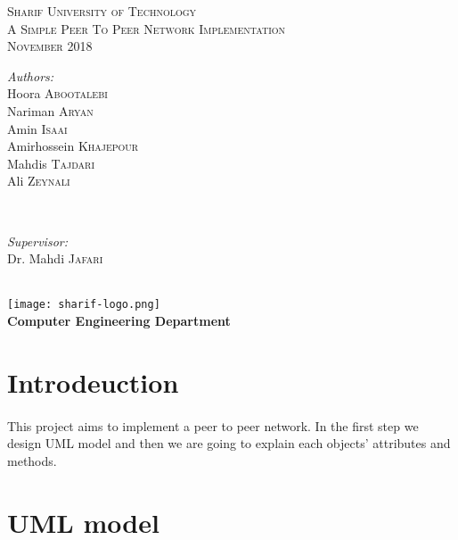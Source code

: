 \documentclass{article}
\begin{document}
\begin{titlepage}
\begin{center}
\textsc{\LARGE Sharif University of Technology}\\[1.5cm]
\textsc{\Large A Simple Peer To Peer Network Implementation}\\[0.5cm]
\textsc{\large November 2018}\\

\begin{minipage}{0.4\textwidth}
\begin{flushleft} \large
\emph{Authors:}\\
Hoora  \textsc{Abootalebi}\\
Nariman  \textsc{Aryan}\\
Amin \textsc{Isaai}\\
Amirhossein \textsc{Khajepour}\\
Mahdis \textsc{Tajdari}\\
Ali  \textsc{Zeynali} %
\end{flushleft}
\end{minipage}
~
\begin{minipage}{0.4\textwidth}
\begin{flushright} \large
\emph{Supervisor:} \\
Dr. Mahdi \textsc{Jafari} %
\end{flushright}
\end{minipage}\\[2cm]
\texttt{[image: sharif-logo.png]}\\
\textbf{Computer Engineering Department}
\end{center}
\end{titlepage}
\large
\clearpage
\tableofcontents
\clearpage
\section{Introdeuction}
\paragraph{}This project aims to implement a peer to peer network. In the first step we design UML model and then we are going to explain each objects' attributes and methods. 
\section{UML model}
\end{document}
